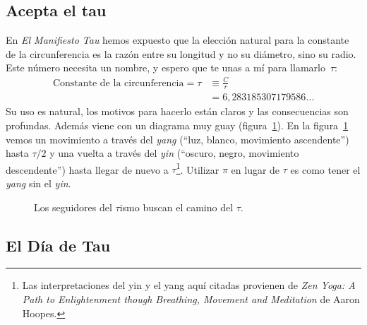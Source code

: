 
  \subsection{Acepta el tau} %
  \label{sec:embrace_the_tau}

En \emph{El Manifiesto Tau} hemos expuesto que la elección natural para la constante de la circunferencia es la razón entre su longitud y no su diámetro, sino su radio. Este número necesita un nombre, y espero que te unas a mí para llamarlo~$\tau$:
\[
\begin{split}
\mbox{Constante de la circunferencia} = \tau & \equiv \frac{C}{r} \\
                                             & = 6{,}283185307179586\ldots
\end{split}
\]
Su uso es natural, los motivos para hacerlo están claros y las consecuencias son profundas. Además viene con un diagrama muy guay (figura~\ref{fig:tauism}). En la figura~\ref{fig:tauism} vemos un movimiento a través del \emph{yang} (``luz, blanco, movimiento ascendente'') hasta $\tau/2$ y una vuelta a través del \emph{yin} (``oscuro, negro, movimiento descendente'') hasta llegar de nuevo a $\tau$\footnote{Las interpretaciones del yin y el yang aquí citadas provienen de \emph{Zen Yoga: A Path to Enlightenment though Breathing, Movement and Meditation} de Aaron Hoopes.}. Utilizar $\pi$ en lugar de $\tau$ es como tener el \emph{yang} sin el \emph{yin}.

\begin{figure}
\begin{center}
\end{center}
\caption{Los seguidores del $\tau$ismo buscan el camino del $\tau$.\label{fig:tauism}}
\end{figure}



\renewcommand{\thesubsection}{6.28}

  \subsection{El Día de Tau} %
  \label{sec:tau_day}


